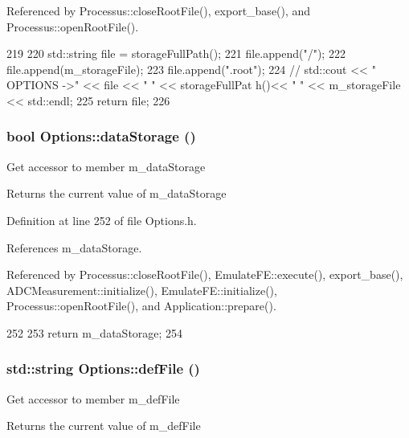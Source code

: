 Referenced by Processus::closeRootFile(), export\_\-base(), and Processus::openRootFile().


\begin{DoxyCode}
219                                      {
220                 std::string file = storageFullPath();
221                 file.append("/");
222                 file.append(m_storageFile);
223                 file.append(".root");
224                 //    std::cout << " OPTIONS ->" << file << " " << storageFullPat
      h()<< " " << m_storageFile  << std::endl;
225                 return file;
226         }
\end{DoxyCode}
\hypertarget{classOptions_aed7799d10139fa542055b982cb820192}{
\subsubsection[{dataStorage}]{\setlength{\rightskip}{0pt plus 5cm}bool Options::dataStorage ()}}
\label{classOptions_aed7799d10139fa542055b982cb820192}
Get accessor to member m\_\-dataStorage \begin{DoxyReturn}{Returns}
the current value of m\_\-dataStorage 
\end{DoxyReturn}


Definition at line 252 of file Options.h.

References m\_\-dataStorage.

Referenced by Processus::closeRootFile(), EmulateFE::execute(), export\_\-base(), ADCMeasurement::initialize(), EmulateFE::initialize(), Processus::openRootFile(), and Application::prepare().


\begin{DoxyCode}
252                             {
253                 return m_dataStorage;
254         }
\end{DoxyCode}
\hypertarget{classOptions_aca5ce5262ca717eaad5ff9db92ad1948}{
\subsubsection[{defFile}]{\setlength{\rightskip}{0pt plus 5cm}std::string Options::defFile ()}}
\label{classOptions_aca5ce5262ca717eaad5ff9db92ad1948}
Get accessor to member m\_\-defFile \begin{DoxyReturn}{Returns}
the current value of m\_\-defFile 
\end{DoxyReturn}


